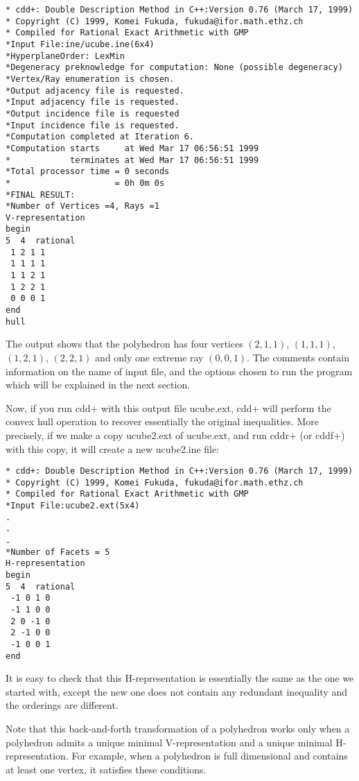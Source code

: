 \documentclass[11pt]{article}
\begin{document}
\begin{verbatim}
* cdd+: Double Description Method in C++:Version 0.76 (March 17, 1999)
* Copyright (C) 1999, Komei Fukuda, fukuda@ifor.math.ethz.ch
* Compiled for Rational Exact Arithmetic with GMP
*Input File:ine/ucube.ine(6x4)
*HyperplaneOrder: LexMin
*Degeneracy preknowledge for computation: None (possible degeneracy)
*Vertex/Ray enumeration is chosen.
*Output adjacency file is requested.
*Input adjacency file is requested.
*Output incidence file is requested
*Input incidence file is requested.
*Computation completed at Iteration 6.
*Computation starts     at Wed Mar 17 06:56:51 1999
*            terminates at Wed Mar 17 06:56:51 1999
*Total processor time = 0 seconds
*                     = 0h 0m 0s
*FINAL RESULT:
*Number of Vertices =4, Rays =1
V-representation
begin
5  4  rational
 1 2 1 1
 1 1 1 1
 1 1 2 1
 1 2 2 1
 0 0 0 1
end
hull
\end{verbatim}

The output shows that the polyhedron has four vertices
$(2,1,1)$, $(1,1,1)$, $(1,2,1)$, $(2,2,1)$ and
only one extreme ray $(0,0,1)$.  The comments contain
information on the name of input file, and the options
chosen to run the program which will be explained in
the next section.  

Now, if you run cdd+ with this output file ucube.ext,
cdd+ will perform the convex hull operation to recover 
essentially the original inequalities.  More precisely, if
we make a copy ucube2.ext of ucube.ext, and run
cddr+ (or cddf+) with this copy, it will create a new ucube2.ine file:

\begin{verbatim}
* cdd+: Double Description Method in C++:Version 0.76 (March 17, 1999)
* Copyright (C) 1999, Komei Fukuda, fukuda@ifor.math.ethz.ch
* Compiled for Rational Exact Arithmetic with GMP
*Input File:ucube2.ext(5x4)
.
.
.
*Number of Facets = 5
H-representation
begin
5  4  rational
 -1 0 1 0
 -1 1 0 0
 2 0 -1 0
 2 -1 0 0
 -1 0 0 1
end
\end{verbatim}

It is easy to check that this H-representation is
essentially the same as the one we started with, except the
new one does not contain any redundant inequality and the orderings
are different.

Note that this back-and-forth transformation of a polyhedron works
only when a polyhedron admits a unique minimal V-representation
and a unique minimal H-representation.
For example, when a polyhedron is full dimensional and contains
at least one vertex, it satisfies these conditions.
\end{document}
